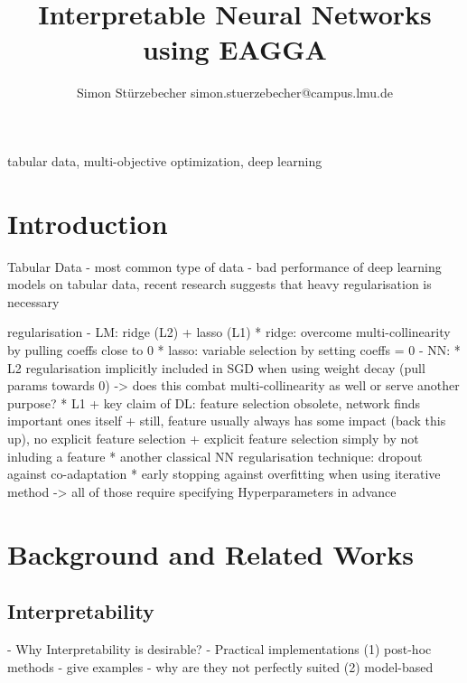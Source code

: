 \documentclass[twoside,11pt]{article}
\begin{document}
\title{Interpretable Neural Networks using EAGGA}

\author{\name Simon Stürzebecher \email simon.stuerzebecher@campus.lmu.de}


\maketitle

\begin{abstract}%
\end{abstract}

\begin{keywords}
  tabular data, multi-objective optimization, deep learning
\end{keywords}

\section{Introduction}
Tabular Data
- most common type of data
- bad performance of deep learning models on tabular data, recent research suggests that heavy regularisation is necessary

regularisation
- LM: ridge (L2) + lasso (L1)
  * ridge: overcome multi-collinearity by pulling coeffs close to 0
  * lasso: variable selection by setting coeffs = 0
- NN:
  * L2 regularisation implicitly included in SGD when using weight decay (pull params towards 0) -> does this combat multi-collinearity as well or serve another purpose?
  * L1
    + key claim of DL: feature selection obsolete, network finds important ones itself
    + still, feature usually always has some impact (back this up), no explicit feature selection
    + explicit feature selection simply by not inluding a feature
  * another classical NN regularisation technique: dropout against co-adaptation
  * early stopping against overfitting when using iterative method
-> all of those require specifying Hyperparameters in advance



\section{Background and Related Works}

\subsection{Interpretability}
- Why Interpretability is desirable?
- Practical implementations
  (1) post-hoc methods
    - give examples
    - why are they not perfectly suited
  (2) model-based
\end{document}
